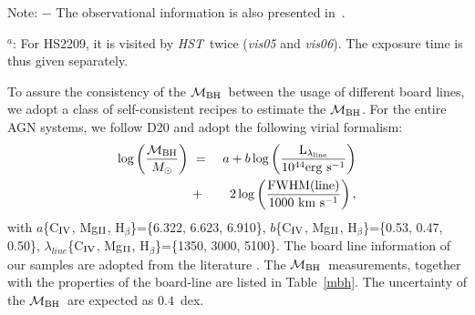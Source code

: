 \documentclass[fleqn,usenatbib]{mnras}
\newcommand{\hst}{{\it HST}}
\newcommand{\mbh}{$\mathcal M_{\rm BH}$}
\newcommand{\Hb}{H$_{\beta}$}
\newcommand{\Mgii}{Mg$_{\rm II}$}
\newcommand{\Civ}{C$_{\rm IV}$}
\begin{document}
\begin{table}
\centering
\caption{Summary of lensed AGN observational details.}\label{data_set}
\begin{tablenotes}
      \small
      \item Note: $-$ The observational information is also presented in~\citet{Ding2017a}. 
      \item $^a$: For HS2209, it is visited by \hst\ twice ({\it vis05} and {\it vis06}). The exposure time is thus given separately.
\end{tablenotes}  
\end{table}

To assure the consistency of the \mbh\ between the usage of different board lines, we adopt a class of self-consistent recipes to estimate the \mbh. For the entire AGN systems, we follow D20 and adopt the following virial formalism:
\begin{eqnarray}
\label{recipe}
\log \left(\frac{\mathcal M_{\rm BH}}{M_{\odot}}\right)&~=~& a+b \log \left(\frac{ \rm L _{\lambda_{line}}}{10^{44}{\rm erg~s^{-1}}}\right) \nonumber\\
&~+~& 2 \log \left(\frac{\rm FWHM(line)}{1000 ~{\rm km~s^{-1}}}\right) , 
\end {eqnarray}
%
with $a$\{\Civ, \Mgii, \Hb\}=\{6.322, 6.623, 6.910\},
$b$\{\Civ, \Mgii, \Hb\}=\{0.53, 0.47, 0.50\},
$\lambda_{line}$\{\Civ, \Mgii, \Hb\}=\{1350, 3000, 5100\}.
%
The board line information of our samples are adopted from the literature \citep{Sluse2012, Peng2006, Shen2011}. The \mbh\ measurements, together with the properties of the board-line are listed in Table~\ref{mbh}. The uncertainty of the \mbh\ are expected as $0.4$~dex.
\end{document}
